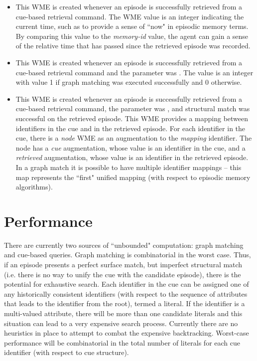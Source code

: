 \begin{itemize}
\item {}

This WME is created whenever an episode is successfully retrieved from a cue-based retrieval command.  The WME value is an integer indicating the current time, such as to provide a sense of ``now" in episodic memory terms.  By comparing this value to the \emph{memory-id} value, the agent can gain a sense of the relative time that has passed since the retrieved episode was recorded.

\item {}

This WME is created whenever an episode is successfully retrieved from a cue-based retrieval command and the  parameter was .  The value is an integer with value 1 if graph matching was executed successfully and 0 otherwise.

\item {}

This WME is created whenever an episode is successfully retrieved from a cue-based retrieval command, the  parameter was , and structural match was successful on the retrieved episode.  This WME provides a mapping between identifiers in the cue and in the retrieved episode.  For each identifier in the cue, there is a \emph{node} WME as an augmentation to the \emph{mapping} identifier.  The node has a \emph{cue} augmentation, whose value is an identifier in the cue, and a \emph{retrieved} augmentation, whose value is an identifier in the retrieved episode.  In a graph match it is possible to have multiple identifier mappings -- this map represents the ``first" unified mapping (with respect to episodic memory algorithms).

\end{itemize}

\section{Performance}
\label{EPMEM-perf}

There are currently two sources of ``unbounded" computation: graph matching and cue-based queries.  Graph matching is combinatorial in the worst case.  Thus, if an episode presents a perfect surface match, but imperfect structural match (i.e. there is no way to unify the cue with the candidate episode), there is the potential for exhaustive search.  Each identifier in the cue can be assigned one of any historically consistent identifiers (with respect to the sequence of attributes that leads to the identifier from the root), termed a literal.  If the identifier is a multi-valued attribute, there will be more than one candidate literals and this situation can lead to a very expensive search process.  Currently there are no heuristics in place to attempt to combat the expensive backtracking.  Worst-case performance will be combinatorial in the total number of literals for each cue identifier (with respect to cue structure).

